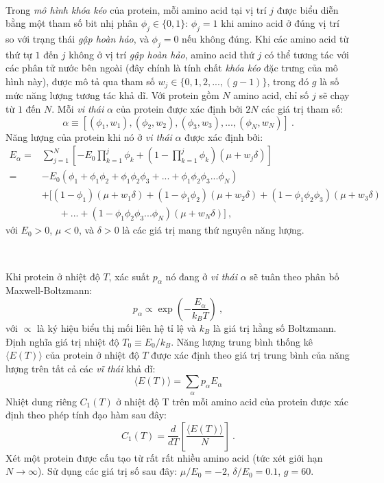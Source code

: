 \ \ 

Trong \textit{mô hình khóa kéo} của protein, mỗi amino acid tại vị trí $j$ được biểu diễn bằng một tham số bit nhị phân $\phi_j \in \{ 0,1 \}$: $\phi_j = 1$ khi amino acid ở đúng vị trí so với trạng thái \textit{gập hoàn hảo}, và $\phi_j = 0$ nếu không đúng. Khi các amino acid từ thứ tự $1$ đến $j$ không ở vị trí \textit{gập hoàn hảo}, amino acid thứ $j$ có thể tương tác với các phân tử nước bên ngoài (đây chính là tính chất \textit{khóa kéo} đặc trưng của mô hình này), được mô tả qua tham số $w_j \in \{ 0,1,2,...,(g-1)\}$, trong đó $g$ là số mức năng lượng tương tác khả dĩ. Với protein gồm $N$ amino acid, chỉ số $j$ sẽ chạy từ $1$ đến $N$. Mỗi \textit{vi thái} $\alpha$ của protein được xác định bởi $2N$ các giá trị tham số:
$$\alpha \equiv \left[ (\phi_1,w_1), (\phi_2,w_2), (\phi_3,w_3), ..., (\phi_N,w_N) \right] \ . $$
Năng lượng của protein khi nó ở \textit{vi thái} $\alpha$ được xác định bởi:
\begin{equation}
\begin{split}
    E_\alpha = & \sum^N_{j=1} \left[-E_0 \prod^j_{k=1} \phi_k + \left(1-\prod^j_{k=1} \phi_k \right)(\mu+w_j \delta ) \right]
    \\
    = &-E_0 \left(\phi_1 + \phi_1 
 \phi_2  + \phi_1 \phi_2 \phi_3 + ... + \phi_1 \phi_2 \phi_3 ... \phi_N \right)
 \\
 &+\Big[(1-\phi_1)(\mu + w_1 \delta ) + (1-\phi_1\phi_2)(\mu + w_2 \delta ) + (1-\phi_1\phi_2 \phi_3)(\mu + w_3 \delta ) 
 \\
 & \ \ \ \ \ \ \ \ + ... + (1-\phi_1\phi_2 \phi_3 ... \phi_N)(\mu + w_N \delta ) \Big] \ ,
\end{split}
\end{equation}
với $E_0>0$, $\mu<0$, và $\delta>0$ là các giá trị mang thứ nguyên năng lượng. 

\ \ 

Khi protein ở nhiệt độ $T$, xác suất $p_\alpha$ nó đang ở \textit{vi thái} $\alpha$ sẽ tuân theo phân bố Maxwell-Boltzmann:
\begin{equation}
    p_\alpha \propto \exp\left( -\frac{E_\alpha}{k_B T} \right) \ ,
\label{prob}
\end{equation}
với $\propto$ là ký hiệu biểu thị mối liên hệ tỉ lệ và $k_B$ là giá trị hằng số Boltzmann. Định nghĩa giá trị nhiệt độ $T_0 \equiv E_0/k_B$. Năng lượng trung bình thống kê $\langle E(T) \rangle$ của protein ở nhiệt độ $T$ được xác định theo giá trị trung bình của năng lượng trên tất cả các \textit{vĩ thái} khả dĩ:
\begin{equation}
    \langle E(T) \rangle = \sum_\alpha p_\alpha E_\alpha
\label{E_avg}
\end{equation}
Nhiệt dung riêng $C_1(T)$ ở nhiệt độ T trên mỗi amino acid của protein được xác định theo phép tính đạo hàm sau đây:
\begin{equation}
    C_1(T) = \frac{d}{dT} \left[\frac{\langle E(T)\rangle}{N} \right] \ .
\label{heat_cap}
\end{equation}
Xét một protein được cấu tạo từ rất rất nhiều amino acid (tức xét giới hạn $N\rightarrow \infty$). Sử dụng các giá trị số sau đây: $\mu/E_0=-2$, $\delta/E_0=0.1$, $g=60$.

